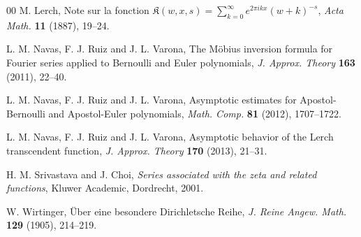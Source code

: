 \documentclass[11pt,a4paper,reqno]{amsart}
\theoremstyle{plain}
\theoremstyle{remark}
\numberwithin{equation}{section}
\begin{document}
\begin{thebibliography}{00}
M. Lerch,
Note sur la fonction $\mathfrak{K}(w,x,s) = \sum_{k=0}^{\infty} e^{2\pi ikx}(w+k)^{-s}$,
\textit{Acta Math.}
\textbf{11} (1887), 19--24.

L. M. Navas, F. J. Ruiz and J. L. Varona,
The M\"obius inversion formula for Fourier series
applied to Bernoulli and Euler polynomials,
\textit{J. Approx. Theory}
\textbf{163} (2011), 22--40.

L. M. Navas, F. J. Ruiz and J. L. Varona,
Asymptotic estimates for Apostol-Bernoulli and Apostol-Euler polynomials,
\textit{Math. Comp.}
\textbf{81} (2012), 1707--1722.

L. M. Navas, F. J. Ruiz and J. L. Varona,
Asymptotic behavior of the Lerch transcendent function,
\textit{J. Approx. Theory}
\textbf{170} (2013), 21--31. 

H. M. Srivastava and J. Choi,
\textit{Series associated with the zeta and related functions},
Kluwer Academic, Dordrecht, 2001.

W. Wirtinger,
\"Uber eine besondere Dirichletsche Reihe,
\textit{J. Reine Angew. Math.} \textbf{129} (1905), 214--219.

\end{thebibliography}

\end{document}
